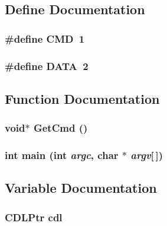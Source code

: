 \subsection{Define Documentation}
\subsubsection{\setlength{\rightskip}{0pt plus 5cm}\#define CMD~1}\label{main_8c_0a5ceb9ceb914e08d345410b561cb37a}


\subsubsection{\setlength{\rightskip}{0pt plus 5cm}\#define DATA~2}\label{main_8c_ad9ae913bdfab20dd94ad04ee2d5b045}




\subsection{Function Documentation}
\subsubsection{\setlength{\rightskip}{0pt plus 5cm}void$\ast$ Get\-Cmd ()}\label{main_8c_9ab8d44953ee3c4f3c33b62c9223676c}


\subsubsection{\setlength{\rightskip}{0pt plus 5cm}int main (int {\em argc}, char $\ast$ {\em argv}[$\,$])}\label{main_8c_0ddf1224851353fc92bfbff6f499fa97}




\subsection{Variable Documentation}
\subsubsection{\setlength{\rightskip}{0pt plus 5cm}\bf{CDLPtr} \bf{cdl}}\label{main_8c_f5edaa249017b01d140d79f1737b8b9a}


